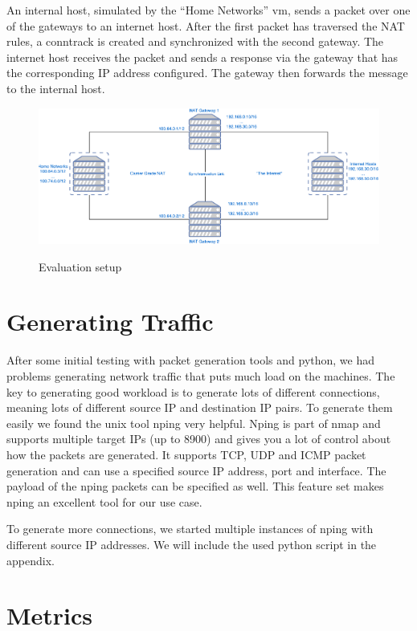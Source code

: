 \documentclass{report}
\begin{document}
An internal host, simulated by the ``Home Networks'' vm, sends a packet
over one of the gateways to an internet host. After the first packet has
traversed the NAT rules, a conntrack is created and synchronized with the
second gateway. The internet host receives the packet and sends a
response via the gateway that has the corresponding IP address
configured. The gateway then forwards the message to the internal host.

\begin{figure}[ht]
	\centering
	\includegraphics[width=\textwidth]{../EvaluationSetup.pdf}
	\label{EvaluationSetup.pdf}
	\caption{Evaluation setup}  
\end{figure}

\section{Generating Traffic}\label{generating-traffic}

After some initial testing with packet generation tools and python, we
had problems generating network traffic that puts much load on the
machines. The key to generating good workload is to generate lots of
different connections, meaning lots of different source IP and destination
IP pairs. To generate them easily we found the unix tool nping\cite{nping}
very helpful. Nping is part of nmap\cite{nmap} and supports multiple target
IPs (up to 8900) and gives you a lot of control about how the packets
are generated. It supports TCP, UDP and ICMP packet generation and can
use a specified source IP address, port and interface. The payload of
the nping packets can be specified as well. This feature set makes nping
an excellent tool for our use case.

To generate more connections, we started multiple instances of nping with
different source IP addresses. We will include the used python script in
the appendix.



\section{Metrics}\label{metrics}
\end{document}
